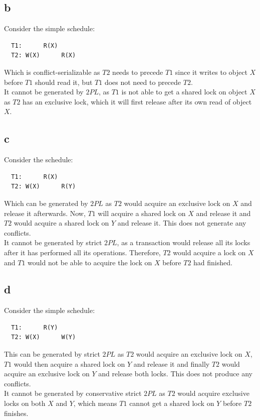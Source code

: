 \documentclass[a4paper]{article}
\begin{document}
\subsection{b}
Consider the simple schedule:
\begin{verbatim}
  T1:      R(X)
  T2: W(X)      R(X)
\end{verbatim}
Which is conflict-serializable as $T2$ needs to precede $T1$ since it writes to object $X$ before $T1$ should read it, but $T1$ does not need to precede $T2$. \\
It cannot be generated by $2PL$, as $T1$ is not able to get a shared lock on object $X$ as $T2$ has an exclusive lock, which it will first release after its own read of object $X$.

\subsection{c}
Consider the schedule:
\begin{verbatim}
  T1:      R(X)
  T2: W(X)      R(Y)
\end{verbatim}
Which can be generated by $2PL$ as $T2$ would acquire an exclusive lock on $X$ and release it afterwards. Now, $T1$ will acquire a shared lock on $X$ and release it and $T2$ would acquire a shared lock on $Y$ and release it. This does not generate any conflicts. \\
It cannot be generated by strict $2PL$, as a transaction would release all its locks after it has performed all its operations. Therefore, $T2$ would acquire a lock on $X$ and $T1$ would not be able to acquire the lock on $X$ before $T2$ had finished.

\subsection{d}
Consider the simple schedule:
\begin{verbatim}
  T1:      R(Y)
  T2: W(X)      W(Y)
\end{verbatim}
This can be generated by strict $2PL$ as $T2$ would acquire an exclusive lock on $X$, $T1$ would then acquire a shared lock on $Y$ and release it and finally $T2$ would acquire an exclusive lock on $Y$ and release both locks. This does not produce any conflicts. \\
It cannot be generated by conservative strict $2PL$ as $T2$ would acquire exclusive locks on both $X$ and $Y$, which means $T1$ cannot get a shared lock on $Y$ before $T2$ finishes.
\end{document}
